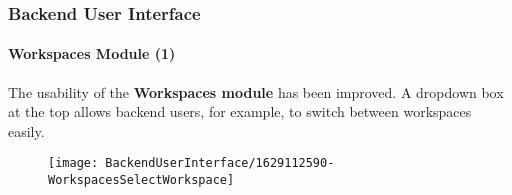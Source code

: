 %

\begin{frame}[fragile]
	\frametitle{Backend User Interface}
	\framesubtitle{Workspaces Module (1)}

	The usability of the \textbf{Workspaces module} has been improved. A dropdown
	box at the top allows backend users, for example, to switch between workspaces
	easily.

	\begin{figure}
		\texttt{[image: BackendUserInterface/1629112590-WorkspacesSelectWorkspace]}
	\end{figure}

\end{frame}


